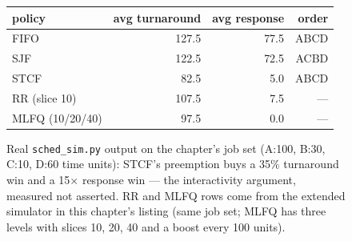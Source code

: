 \begin{figure}[htbp]
\centering
\begin{tabular}{lrrr}
\toprule
policy & avg turnaround & avg response & order \\
\midrule
FIFO & 127.5 & 77.5 & ABCD \\
SJF  & 122.5 & 72.5 & ACBD \\
STCF & 82.5  & 5.0  & ABCD \\
RR (slice 10) & 107.5 & 7.5 & --- \\
MLFQ (10/20/40) & 97.5 & 0.0 & --- \\
\bottomrule
\end{tabular}
\caption{Real \texttt{sched\_sim.py} output on the chapter's job set
(A:100, B:30, C:10, D:60 time units): STCF's preemption buys a
35\% turnaround win and a 15$\times$ response win --- the
interactivity argument, measured not asserted. RR and MLFQ rows
come from the extended simulator in this chapter's listing (same
job set; MLFQ has three levels with slices 10, 20, 40 and a boost
every 100 units).}
\label{fig:schedcmp12}
\end{figure}
